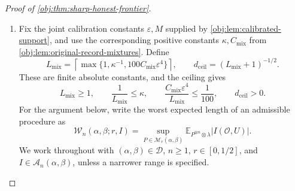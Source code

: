 \begin{proof}[Proof of \cref{obj:thm:sharp-honest-frontier}]
\begin{enumerate}
\item Fix the joint calibration constants \(\varepsilon,M\) supplied by
\cref{obj:lem:calibrated-support}, and use the corresponding positive constants
\(\kappa,C_{\mathrm{mix}}\) from \cref{obj:lem:original-record-mixtures}. Define
\[
L_{\mathrm{mix}}
=
\left\lceil
\max\{1,\kappa^{-1},100C_{\mathrm{mix}}\varepsilon^4\}
\right\rceil,
\qquad
d_{\mathrm{ceil}}=(L_{\mathrm{mix}}+1)^{-1/2}.
\]
These are finite absolute constants, and the ceiling gives
\[
L_{\mathrm{mix}}\ge1,\qquad
\frac1{L_{\mathrm{mix}}}\le\kappa,\qquad
\frac{C_{\mathrm{mix}}\varepsilon^4}{L_{\mathrm{mix}}}
\le\frac1{100},\qquad
d_{\mathrm{ceil}}>0.
\]
For the argument below, write the worst expected length of an admissible procedure as
\[
\mathcal W_n(\alpha,\beta;r,I)
=
\sup_{P\in\mathcal M_r(\alpha,\beta)}
\mathbb E_{P^{\otimes n}\otimes\lambda}
|I(\mathcal O,U)|.
\]
We work throughout with \((\alpha,\beta)\in\mathcal D\), \(n\ge1\),
\(r\in[0,1/2]\), and \(I\in\mathcal A_n(\alpha,\beta)\), unless a narrower
range is specified.


\end{enumerate}
\end{proof}
